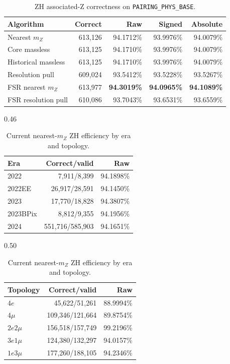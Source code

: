 \documentclass[11pt]{article}
\newcommand{\mZ}{m_{Z}}
\newcommand{\physbase}{\texttt{PAIRING\_PHYS\_BASE}}
\begin{document}
\begin{table}[htbp]
\centering
\caption{ZH associated-Z correctness on \physbase.}
\label{tab:zhmain}
\begin{tabular}{l r r r r}
\toprule
Algorithm & Correct & Raw & Signed & Absolute \\
\midrule
Nearest $\mZ$ & 613,126 & 94.1712\% & 93.9976\% & 94.0079\% \\
Core massless & 613,125 & 94.1710\% & 93.9976\% & 94.0079\% \\
Historical massless & 613,125 & 94.1710\% & 93.9976\% & 94.0079\% \\
Resolution pull & 609,024 & 93.5412\% & 93.5228\% & 93.5267\% \\
FSR nearest $\mZ$ & 613,977 & \textbf{94.3019\%} & \textbf{94.0965\%} & \textbf{94.1089\%} \\
FSR resolution pull & 610,086 & 93.7043\% & 93.6531\% & 93.6559\% \\
\bottomrule
\end{tabular}
\end{table}

\begin{table}[htbp]
\centering
\caption{Current nearest-$\mZ$ ZH efficiency by era and topology.}
\begin{subtable}[t]{0.46\textwidth}
\centering
\begin{tabular}{l r r}
\toprule
Era & Correct/valid & Raw \\
\midrule
2022 & 7,911/8,399 & 94.1898\% \\
2022EE & 26,917/28,591 & 94.1450\% \\
2023 & 17,770/18,828 & 94.3807\% \\
2023BPix & 8,812/9,355 & 94.1956\% \\
2024 & 551,716/585,903 & 94.1651\% \\
\bottomrule
\end{tabular}
\end{subtable}\hfill
\begin{subtable}[t]{0.50\textwidth}
\centering
\begin{tabular}{l r r}
\toprule
Topology & Correct/valid & Raw \\
\midrule
$4e$ & 45,622/51,261 & 88.9994\% \\
$4\mu$ & 109,346/121,664 & 89.8754\% \\
$2e2\mu$ & 156,518/157,749 & 99.2196\% \\
$3e1\mu$ & 124,380/132,297 & 94.0157\% \\
$1e3\mu$ & 177,260/188,105 & 94.2346\% \\
\bottomrule
\end{tabular}
\end{subtable}
\end{table}
\end{document}
